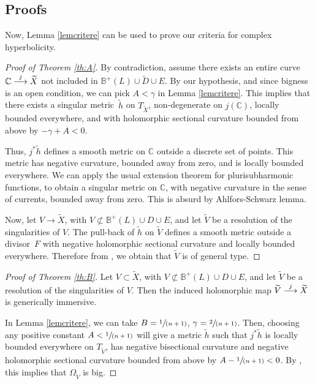 \documentclass[10pt]{amsart}
\newcommand{\spfrac}[2]{\sfrac{#1}{(#2)}}
\def\To#1{\mathchoice{\xrightarrow{\textstyle\kern4pt#1\kern3pt}}{\stackrel{#1}{\longrightarrow}}{}{}}
\theoremstyle{plain}
\theoremstyle{definition}
\numberwithin{equation}{theorem}
\begin{document}
\subsection{Proofs}

Now, Lemma \ref{lemcritere} can be used to prove our criteria for complex hyper\-bolicity.

\begin{proof}[Proof of Theorem \ref{th:A}]

By contradiction, assume there exists an entire curve $\mathbb C \To{j} \widetilde{X}$ not included in $\mathbb B^+(L) \cup \widetilde{D} \cup E$. By our hypothesis, and since bigness is an open condition, we can pick $A < \gamma$ in Lemma \ref{lemcritere}. This implies that there exists a singular metric~$\widetilde{h}$ on $T_{\widetilde{X}}$, non-degenerate on $j(\mathbb C)$, locally bounded everywhere, and with holomorphic sectional curvature bounded from above by $- \gamma + A < 0$.

Thus, $j^\ast \widetilde{h}$ defines a smooth metric on $\mathbb C$ outside a discrete set of points. This metric has negative curvature, bounded away from zero, and is locally bounded everywhere. We can apply the usual extension theorem for plurisubharmonic functions, to obtain a singular metric on $\mathbb C$, with negative curvature in the sense of currents, bounded away from zero. This is absurd by Ahlfors-Schwarz lemma.

Now, let $V \to \widetilde{X}$, with $V \not\subset \mathbb B^+(L) \cup D \cup E$, and let $\widetilde{V}$ be a resolution of the singularities of $V$. The pull-back of $\widetilde{h}$ on $\widetilde{V}$ defines a smooth metric outside a divisor~$F$ with negative holomorphic sectional curvature and locally bounded everywhere. Therefore from \cite[Th.\,B]{G18}, we obtain that $\widetilde{V}$ is of general type.
\end{proof}

\begin{proof}[Proof of Theorem \ref{th:B}] Let $V \subset \widetilde{X}$, with $V \not\subset \mathbb B^+(L) \cup D \cup E$, and let $\widetilde{V}$ be a resolution of the singularities of $V$. Then the induced holomorphic map $\widetilde{V} \To{j} \widetilde{X}$ is generically immersive.

In Lemma \ref{lemcritere}, we can take $B = \spfrac{1}{n+1}$, $\gamma = \spfrac{2}{n+1}$. Then, choosing any positive constant $A < \spfrac{1}{n+1}$ will give a metric $\widetilde{h}$ such that $j^\ast \widetilde{h}$ is locally bounded everywhere on $T_{\widetilde{V}}$, has negative bisectional curvature and negative holomorphic sectional curvature bounded from above by $A - \spfrac{1}{n+1} < 0$. By \cite{cad16}, this implies that $\Omega_{\widetilde{V}}$ is big.
\end{proof}
\end{document}
